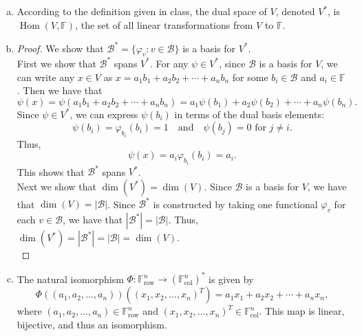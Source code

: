 \documentclass{article}
\begin{document}
\begin{enumerate}[a)]
   \item According to the definition given in class, the dual space of $V$, denoted $V^*$, is $\operatorname{Hom}(V, \mathbb{F})$, the set of all linear transformations from $V$ to $\mathbb{F}$. 
   
   \item \begin{proof}
      We show that $\mathscr{B}^* = \{ \varphi_v : v \in \mathscr{B} \}$ is a basis for $V^*$. \\
      First we show that $\mathscr{B}^*$ spans $V^*$. For any $\psi \in V^*$, since $\mathscr{B}$ is a basis for $V$, we can write any $x \in V$ as $x = a_1b_1 + a_2b_2 + \cdots + a_nb_n$ for some $b_i \in \mathscr{B}$ and $a_i \in \mathbb{F}$. Then we have that 
      \[
         \psi(x) = \psi(a_1b_1 + a_2b_2 + \cdots + a_nb_n) = a_1\psi(b_1) + a_2\psi(b_2) + \cdots + a_n\psi(b_n).
      \]
      Since $\psi \in V^*$, we can express $\psi(b_i)$ in terms of the dual basis elements:
      \[
         \psi(b_i) = \varphi_{b_i}(b_i) = 1 \quad \text{and} \quad \psi(b_j) = 0 \text{ for } j \neq i.
      \]
      Thus,
      \[
         \psi(x) = a_i\varphi_{b_i}(b_i) = a_i.
      \]
      This shows that $\mathscr{B}^*$ spans $V^*$. \\
      Next we show that $\dim(V^*) = \dim(V)$. Since $\mathscr{B}$ is a basis for $V$, we have that $\dim(V) = |\mathscr{B}|$. Since $\mathscr{B}^*$ is constructed by taking one functional $\varphi_v$ for each $v \in \mathscr{B}$, we have that $|\mathscr{B}^*| = |\mathscr{B}|$. Thus, $\dim(V^*) = |\mathscr{B}^*| = |\mathscr{B}| = \dim(V)$. \\
   \end{proof}
   \item The natural isomorphism $\Phi: \mathbb{F}^n_{\text{row}} \to (\mathbb{F}^n_{\text{col}})^*$ is given by
   \[
      \Phi((a_1, a_2, \ldots, a_n))((x_1, x_2, \ldots, x_n)^T) = a_1x_1 + a_2x_2 + \cdots + a_nx_n,
   \]
   where $(a_1, a_2, \ldots, a_n) \in \mathbb{F}^n_{\text{row}}$ and $(x_1, x_2, \ldots, x_n)^T \in \mathbb{F}^n_{\text{col}}$. This map is linear, bijective, and thus an isomorphism.
\end{enumerate}
\end{document}
